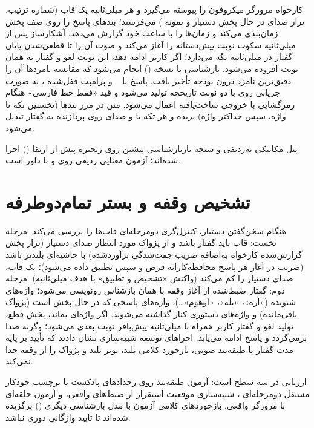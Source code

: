 کارخواه مرورگر میکروفون را پیوسته می‌گیرد و هر  میلی‌ثانیه یک قاب
(شماره ترتیب، تراز صدای در حال پخش دستیار و  نمونه )
می‌فرستد؛ بندهای پاسخ را روی صف پخش زمان‌بندی می‌کند و زمان‌ها را با ساعت
خود گزارش می‌دهد. آشکارساز  پس از  میلی‌ثانیه سکوت نوبت
پیش‌دستانه را آغاز می‌کند و صوت آن را تا قطعی‌شدن پایان گفتار در 
میلی‌ثانیه نگه می‌دارد؛ اگر کاربر ادامه دهد، این نوبت لغو و گفتار به همان
نوبت افزوده می‌شود. بازشناسی با  نسخه  () انجام می‌شود
که مقایسه نامزدها آن را دقیق‌ترین نامزد درون بودجه تأخیر یافت. پاسخ با
~\cite{qwen2025qwen3} و پرامپت قفل‌شده ، به
صورت جریانی روی  با دو نوبت تاریخچه تولید می‌شود و قید «فقط خط
فارسی» هنگام رمزگشایی با خروجی ساخت‌یافته اعمال می‌شود. متن در مرز بندها
(نخستین تکه  تا  واژه، سپس حداکثر  واژه) بریده و هر تکه با
 و صدای  روی پردازنده به گفتار تبدیل می‌شود.

پنل مکانیکی نه‌ردیفی و سنجه بازبازشناسی پیشین روی زنجیره پیش از ارتقا
() اجرا شده‌اند؛ آزمون معنایی  ردیفی روی
 و با داور  است.

\section{تشخیص وقفه و بستر تمام‌دوطرفه}
\label{sec:bargein}

هنگام سخن‌گفتن دستیار، کنترل‌گری دومرحله‌ای قاب‌ها را بررسی می‌کند. مرحله
نخست: قاب باید گفتار باشد و از پژواک مورد انتظار صدای دستیار (تراز پخش
گزارش‌شده کارخواه به‌اضافه ضریب جفت‌شدگی برآوردشده) با حاشیه‌ای بلندتر
باشد (ضریب در آغاز هر پاسخ محافظه‌کارانه فرض و سپس تطبیق داده می‌شود)؛ یک قاب، صدای دستیار را کم می‌کند (واکنش «تشخیص و تطبیق» با
هدف  میلی‌ثانیه). مرحله دوم: گفتار ضبط‌شده از آغاز وقفه با همان
بازشناس رونویسی می‌شود؛ واژه‌های شنونده («آره»، «بله»، «اوهوم»…)، واژه‌های
پاسخی که در حال پخش است (پژواک باقی‌مانده) و واژه‌های دستوری کنار گذاشته
می‌شوند. اگر واژه‌ای بماند، پخش قطع، تولید لغو و گفتار کاربر همراه با
 میلی‌ثانیه پیش‌بافر نوبت بعدی می‌شود؛ وگرنه صدا برمی‌گردد و پاسخ
ادامه می‌یابد. اجراهای توسعه شبیه‌سازی نشان دادند که تأیید بر پایه مدت
گفتار یا طبقه‌بند صوتی، بازخورد کلامی بلند، نویز بلند و پژواک را از وقفه
جدا نمی‌کند.

ارزیابی در سه سطح است: آزمون طبقه‌بند روی رخدادهای پادکست با برچسب خودکار
مستقل دومرحله‌ای ، شبیه‌سازی موقعیت استقرار از ضبط‌های واقعی، و
آزمون حلقه‌ای با مرورگر واقعی. بازخوردهای کلامی آزمون با مدل بازشناسی دیگری
() برگزیده شده‌اند تا تأیید واژگانی دوری نباشد.


